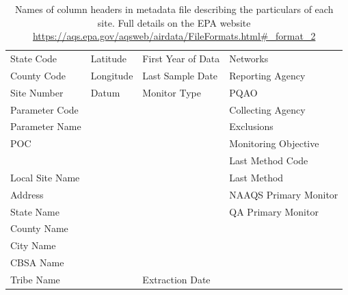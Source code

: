 \documentclass{article}
\begin{document}
\begin{table}[ht]
    \centering
    \begin{tabular}{l|l|l|l}
    \hline
    State Code & Latitude & First Year of Data &  Networks\\
    County Code & Longitude & Last Sample Date &  Reporting Agency\\
    Site Number & Datum & Monitor Type & PQAO\\
    Parameter Code & & & Collecting Agency\\
    Parameter Name & & & Exclusions\\
    POC & & & Monitoring Objective\\
     & & & Last Method Code \\
    Local Site Name & & & Last Method \\
    Address & & & NAAQS Primary Monitor \\
    State Name & & & QA Primary Monitor \\
    County Name & & & \\
    City Name & & & \\
    CBSA Name & & & \\
    Tribe Name & & Extraction Date & \\
    \end{tabular}
    \caption{Names of column headers in metadata file describing the particulars of each site.  Full details on the \ac{EPA} website \url{https://aqs.epa.gov/aqsweb/airdata/FileFormats.html\#_format_2}}
 \label{table:metadata_column_headers}
\end{table}
   
\end{document}
